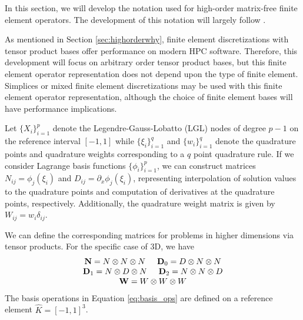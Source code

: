In this section, we will develop the notation used for high-order matrix-free finite element operators.
The development of this notation will largely follow \cite{brown2010efficient}.

As mentioned in Section \ref{sec:highorderwhy}, finite element discretizations with tensor product bases offer performance on modern HPC software.
Therefore, this development will focus on arbitrary order tensor product bases, but this finite element operator representation does not depend upon the type of finite element.
Simplices or mixed finite element discretizations may be used with this finite element operator representation, although the choice of finite element bases will have performance implications.

Let $\lbrace X_i \rbrace_{i = 1}^p$ denote the Legendre-Gauss-Lobatto (LGL) nodes of degree $p - 1$ on the reference interval $\left[ -1, 1 \right]$ while $\lbrace \xi_i \rbrace_{i = 1}^q$ and $\lbrace w_i \rbrace_{i = 1}^q$ denote the quadrature points and quadrature weights corresponding to a $q$ point quadrature rule.
If we consider Lagrange basis functions $\lbrace \phi_i \rbrace_{i = 1}^p$, we can construct matrices $N_{i j} = \phi_j \left( \xi_i \right)$ and $D_{i j} = \partial_x \phi_j \left( \xi_i \right)$, representing interpolation of solution values to the quadrature points and computation of derivatives at the quadrature points, respectively.
Additionally, the quadrature weight matrix is given by $W_{i j} = w_i \delta_{i j}$.

We can define the corresponding matrices for problems in higher dimensions via tensor products.
For the specific case of 3D, we have
\begin{equation}
\begin{array}{c}
\mathbf{N}   = N \otimes N \otimes N \hspace{5mm}
\mathbf{D}_0 = D \otimes N \otimes N\\
\mathbf{D}_1 = N \otimes D \otimes N \hspace{5mm}
\mathbf{D}_2 = N \otimes N \otimes D\\
\mathbf{W}   = W \otimes W \otimes W
\end{array}
\label{eq:basis_ops}
\end{equation}
The basis operations in Equation \ref{eq:basis_ops} are defined on a reference element $\hat{K} = \left[ -1, 1 \right]^3$.

